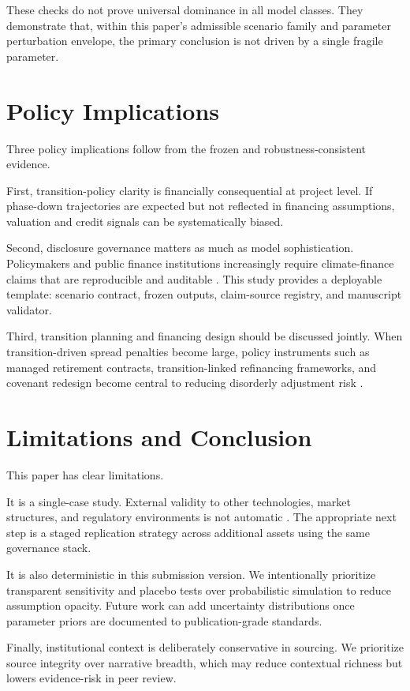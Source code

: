 \documentclass[preprint,12pt]{elsarticle}
\begin{document}
These checks do not prove universal dominance in all model classes. They demonstrate that, within this paper's admissible scenario family and parameter perturbation envelope, the primary conclusion is not driven by a single fragile parameter.

\section{Policy Implications}
Three policy implications follow from the frozen and robustness-consistent evidence.

First, transition-policy clarity is financially consequential at project level. If phase-down trajectories are expected but not reflected in financing assumptions, valuation and credit signals can be systematically biased.

Second, disclosure governance matters as much as model sophistication. Policymakers and public finance institutions increasingly require climate-finance claims that are reproducible and auditable \citep{tcfd2017recommendations}. This study provides a deployable template: scenario contract, frozen outputs, claim-source registry, and manuscript validator.

Third, transition planning and financing design should be discussed jointly. When transition-driven spread penalties become large, policy instruments such as managed retirement contracts, transition-linked refinancing frameworks, and covenant redesign become central to reducing disorderly adjustment risk \citep{ngfs2024,iea2024coal}.

\section{Limitations and Conclusion}
This paper has clear limitations.

It is a single-case study. External validity to other technologies, market structures, and regulatory environments is not automatic \citep{mercure2018stranded}. The appropriate next step is a staged replication strategy across additional assets using the same governance stack.

It is also deterministic in this submission version. We intentionally prioritize transparent sensitivity and placebo tests over probabilistic simulation to reduce assumption opacity. Future work can add uncertainty distributions once parameter priors are documented to publication-grade standards.

Finally, institutional context is deliberately conservative in sourcing. We prioritize source integrity over narrative breadth, which may reduce contextual richness but lowers evidence-risk in peer review.
\end{document}
